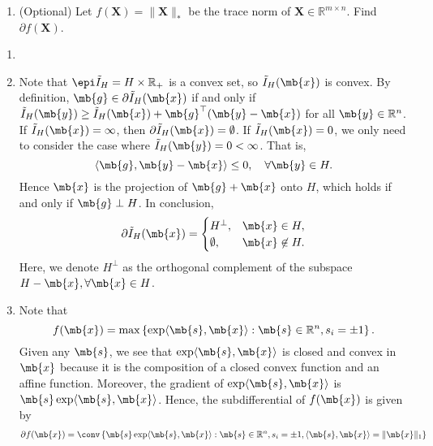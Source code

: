 \begin{exercise}[Subdifferentials]
\begin{enumerate}
\begin{enumerate}
        \item (Optional) Let $f(\textbf{X})=\|\textbf{X}\|_*$ be the trace norm of $\textbf{X}\in\mathbb{R}^{m\times n}$. Find $\partial f(\textbf{X})$.
          
      \end{enumerate}
      
      \begin{solution}
        \begin{enumerate}
          \item []
          \item Note that $\epi \tilde{I}_H = H \times \mathbb{R}_+$ is a convex set, so $\tilde{I}_H(\mb{x})$ is convex. By definition, $\mb{g}\in \partial \tilde{I}_H(\mb{x})$ if and only if $\tilde{I}_H(\mb{y}) \ge \tilde{I}_H(\mb{x}) + \mb{g}^\top(\mb{y}-\mb{x})$ for all $\mb{y}\in \mathbb{R}^n$. If $\tilde{I}_H(\mb{x}) = \infty$, then $\partial \tilde{I}_H(\mb{x}) = \emptyset$. If $\tilde{I}_H(\mb{x}) = 0$, we only need to consider the case where $\tilde{I}_H(\mb{y}) = 0 < \infty$. That is,
            $$
              \langle \mb{g}, \mb{y}-\mb{x} \rangle \le 0, \quad \forall \mb{y}\in H.
            $$
            Hence $\mb{x}$ is the projection of $\mb{g} + \mb{x}$ onto $H$, which holds if and only if $\mb{g} \perp H$. In conclusion, 
            $$
              \partial \tilde{I}_H(\mb{x}) = \begin{cases}
                H^\perp,   & \mb{x}\in H,      \\
                \emptyset, & \mb{x}\not\in H.
              \end{cases}
            $$
            Here, we denote $H^\perp$ as the orthogonal complement of the subspace $H - \mb{x}, \forall\mb{x}\in H$.
          \item Note that
            $$
              f(\mb{x}) = \max\left\{\exp \langle \mb{s}, \mb{x} \rangle : \mb{s}\in\mathbb{R}^n, s_i = \pm 1\right\}.
            $$
            Given any $\mb{s}$, we see that $\exp \langle \mb{s}, \mb{x} \rangle$ is closed and convex in $\mb{x}$ because it is the composition of a closed convex function and an affine function. Moreover, the gradient of $\exp \langle \mb{s}, \mb{x} \rangle$ is  $\mb{s} \exp \langle \mb{s}, \mb{x} \rangle$. Hence, the subdifferential of $f(\mb{x})$ is given by
            \begin{align*}
              \partial f(\mb{x}) & = \conv \left\{ \mb{s} \exp \langle \mb{s}, \mb{x} \rangle : \mb{s}\in\mathbb{R}^n, s_i = \pm 1, \langle \mb{s}, \mb{x} \rangle = \| \mb{x} \|_1 \right\} \\

\end{align*}
\end{enumerate}
\end{solution}
\end{enumerate}
\end{exercise}
